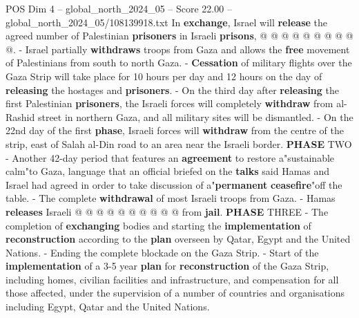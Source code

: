 \begin{textsample}{POS Dim 4 – global\_north\_2024\_05 – Score 22.00 – global\_north\_2024\_05/108139918.txt}
In \textbf{exchange}, Israel will \textbf{release} the agreed number of Palestinian \textbf{prisoners} in Israeli \textbf{prisons}, @ @ @ @ @ @ @ @ @ @. - Israel partially \textbf{withdraws} troops from Gaza and allows the \textbf{free} movement of Palestinians from south to north Gaza. - \textbf{Cessation} of military flights over the Gaza Strip will take place for 10 hours per day and 12 hours on the day of \textbf{releasing} the hostages and \textbf{prisoners}. - On the third day after \textbf{releasing} the first Palestinian \textbf{prisoners}, the Israeli forces will completely \textbf{withdraw} from al-Rashid street in northern Gaza, and all military sites will be dismantled. - On the 22nd day of the first \textbf{phase}, Israeli forces will \textbf{withdraw} from the centre of the strip, east of Salah al-Din road to an area near the Israeli border. \textbf{PHASE} TWO - Another 42-day period that features an \textbf{agreement} to restore a"sustainable calm"to Gaza, language that an official briefed on the \textbf{talks} said Hamas and Israel had agreed in order to take discussion of a"\textbf{permanent} \textbf{ceasefire}"off the table. - The complete \textbf{withdrawal} of most Israeli troops from Gaza. - Hamas \textbf{releases} Israeli @ @ @ @ @ @ @ @ @ @ from \textbf{jail}. \textbf{PHASE} THREE - The completion of \textbf{exchanging} bodies and starting the \textbf{implementation} of \textbf{reconstruction} according to the \textbf{plan} overseen by Qatar, Egypt and the United Nations. - Ending the complete blockade on the Gaza Strip. - Start of the \textbf{implementation} of a 3-5 year \textbf{plan} for \textbf{reconstruction} of the Gaza Strip, including homes, civilian facilities and infrastructure, and compensation for all those affected, under the supervision of a number of countries and organisations including Egypt, Qatar and the United Nations.

\end{textsample}
